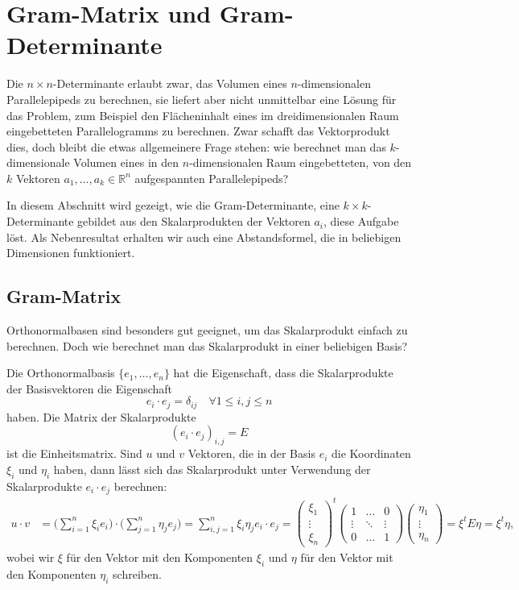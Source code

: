 %
%
%
\section{Gram-Matrix und Gram-Determinante
\label{section:gram}}
Die $n\times n$-Determinante erlaubt zwar, das Volumen eines $n$-dimensionalen
Parallelepipeds zu berechnen, sie liefert aber nicht unmittelbar eine
Lösung für das Problem, zum Beispiel den Flächeninhalt eines im 
dreidimensionalen Raum eingebetteten Parallelogramms zu berechnen.
Zwar schafft das Vektorprodukt dies, doch bleibt die etwas allgemeinere
Frage stehen: wie berechnet man das $k$-dimensionale Volumen eines
in den $n$-dimensionalen Raum eingebetteten, von den $k$ Vektoren 
$a_1,\dots,a_k\in\mathbb{R}^n$ aufgespannten Parallelepipeds?

In diesem Abschnitt wird gezeigt, wie die Gram-Determinante, eine
$k\times k$-Determinante gebildet aus den Skalarprodukten der Vektoren 
$a_i$, diese Aufgabe löst.
Als Nebenresultat erhalten wir auch eine Abstandsformel, die in
beliebigen Dimensionen funktioniert.

\subsection{Gram-Matrix\label{subsection:Gram-Matrix}}
Orthonormalbasen sind besonders gut geeignet, um das Skalarprodukt
einfach zu berechnen.
Doch wie berechnet man das Skalarprodukt in einer beliebigen Basis?

Die Orthonormalbasis $\{e_1,\dots,e_n\}$ hat die Eigenschaft, dass
die Skalarprodukte der Basisvektoren die Eigenschaft
\[
e_i\cdot e_j = \delta_{ij}\quad\forall 1\le i,j\le n
\]
haben.
Die Matrix der Skalarprodukte
\[
(e_i\cdot e_j)_{i,j} = E
\]
ist die Einheitsmatrix.
Sind $u$ und $v$ Vektoren, die in der Basis $e_i$ die Koordinaten
$\xi_i$ und $\eta_i$ haben, dann lässt sich das Skalarprodukt
unter Verwendung der Skalarprodukte $e_i\cdot e_j$ berechnen:
\begin{align*}
u\cdot v
&=
\biggl(\sum_{i=1}^n \xi_i e_i \biggr)
\cdot
\biggl(\sum_{j=1}^n \eta_j e_j \biggr)
=
\sum_{i,j=1}^n
\xi_i \eta_j e_i\cdot e_j
=
\begin{pmatrix}
\xi_1\\\vdots\\\xi_n
\end{pmatrix}^t
\begin{pmatrix}
1     &\dots &0     \\
\vdots&\ddots&\vdots\\
0     &\dots &1
\end{pmatrix}
\begin{pmatrix}
\eta_1\\\vdots\\\eta_n
\end{pmatrix}
=
\xi^t E \eta
=
\xi^t \eta,
\end{align*}
wobei wir $\xi$ für den Vektor mit den Komponenten $\xi_i$ und $\eta$
für den Vektor mit den Komponenten $\eta_i$ schreiben.

